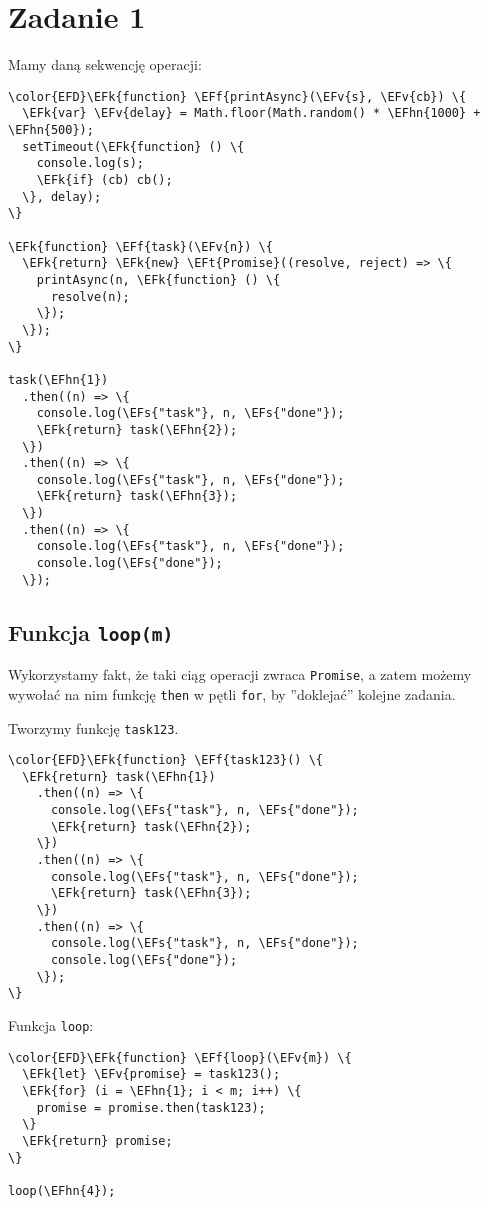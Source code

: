 \documentclass[11pt]{article}
\newcommand{\EFs}[1]{\textcolor{EFs}{#1}} %
\newcommand{\EFk}[1]{\textcolor{EFk}{#1}} %
\newcommand{\EFf}[1]{\textcolor{EFf}{#1}} %
\newcommand{\EFv}[1]{\textcolor{EFv}{#1}} %
\newcommand{\EFt}[1]{\textcolor{EFt}{#1}} %
\newcommand{\EFhn}[1]{\textcolor{EFhn}{#1}} %
\begin{document}
\section*{Zadanie 1}
\label{sec:orgb12d695}
Mamy daną sekwencję operacji:
\begin{Code}
\begin{Verbatim}
\color{EFD}\EFk{function} \EFf{printAsync}(\EFv{s}, \EFv{cb}) \{
  \EFk{var} \EFv{delay} = Math.floor(Math.random() * \EFhn{1000} + \EFhn{500});
  setTimeout(\EFk{function} () \{
    console.log(s);
    \EFk{if} (cb) cb();
  \}, delay);
\}

\EFk{function} \EFf{task}(\EFv{n}) \{
  \EFk{return} \EFk{new} \EFt{Promise}((resolve, reject) => \{
    printAsync(n, \EFk{function} () \{
      resolve(n);
    \});
  \});
\}

task(\EFhn{1})
  .then((n) => \{
    console.log(\EFs{"task"}, n, \EFs{"done"});
    \EFk{return} task(\EFhn{2});
  \})
  .then((n) => \{
    console.log(\EFs{"task"}, n, \EFs{"done"});
    \EFk{return} task(\EFhn{3});
  \})
  .then((n) => \{
    console.log(\EFs{"task"}, n, \EFs{"done"});
    console.log(\EFs{"done"});
  \});
\end{Verbatim}
\end{Code}
\subsection*{Funkcja \texttt{loop(m)}}
\label{sec:org07079a3}
Wykorzystamy fakt, że taki ciąg operacji zwraca \texttt{Promise}, a zatem możemy
wywołać na nim funkcję \texttt{then} w pętli \texttt{for}, by ''doklejać'' kolejne zadania.

Tworzymy funkcję \texttt{task123}.
\begin{Code}
\begin{Verbatim}
\color{EFD}\EFk{function} \EFf{task123}() \{
  \EFk{return} task(\EFhn{1})
    .then((n) => \{
      console.log(\EFs{"task"}, n, \EFs{"done"});
      \EFk{return} task(\EFhn{2});
    \})
    .then((n) => \{
      console.log(\EFs{"task"}, n, \EFs{"done"});
      \EFk{return} task(\EFhn{3});
    \})
    .then((n) => \{
      console.log(\EFs{"task"}, n, \EFs{"done"});
      console.log(\EFs{"done"});
    \});
\}
\end{Verbatim}
\end{Code}

Funkcja \texttt{loop}:
\begin{Code}
\begin{Verbatim}
\color{EFD}\EFk{function} \EFf{loop}(\EFv{m}) \{
  \EFk{let} \EFv{promise} = task123();
  \EFk{for} (i = \EFhn{1}; i < m; i++) \{
    promise = promise.then(task123);
  \}
  \EFk{return} promise;
\}

loop(\EFhn{4});
\end{Verbatim}
\end{Code}
\end{document}
